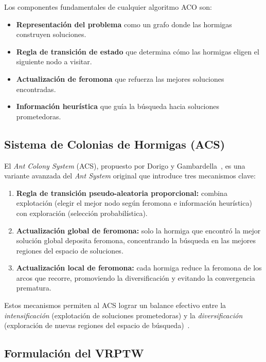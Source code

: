 \documentclass[12pt, letterpaper]{article}
\begin{document}
Los componentes fundamentales de cualquier algoritmo ACO son:
\begin{itemize}[leftmargin=2cm]
  \item \textbf{Representación del problema} como un grafo donde las hormigas construyen soluciones.
  \item \textbf{Regla de transición de estado} que determina cómo las hormigas eligen el siguiente nodo a visitar.
  \item \textbf{Actualización de feromona} que refuerza las mejores soluciones encontradas.
  \item \textbf{Información heurística} que guía la búsqueda hacia soluciones prometedoras.
\end{itemize}

\subsection{Sistema de Colonias de Hormigas (ACS)}
\label{subsec:acs}

El \textit{Ant Colony System} (ACS), propuesto por Dorigo y Gambardella~\cite{dorigo1997}, es una variante avanzada del \textit{Ant System} original que introduce tres mecanismos clave:

\begin{enumerate}[leftmargin=2cm]
  \item \textbf{Regla de transición pseudo-aleatoria proporcional:} combina explotación (elegir el mejor nodo según feromona e información heurística) con exploración (selección probabilística).
  \item \textbf{Actualización global de feromona:} solo la hormiga que encontró la mejor solución global deposita feromona, concentrando la búsqueda en las mejores regiones del espacio de soluciones.
  \item \textbf{Actualización local de feromona:} cada hormiga reduce la feromona de los arcos que recorre, promoviendo la diversificación y evitando la convergencia prematura.
\end{enumerate}

Estos mecanismos permiten al ACS lograr un balance efectivo entre la \textit{intensificación} (explotación de soluciones prometedoras) y la \textit{diversificación} (exploración de nuevas regiones del espacio de búsqueda)~\cite{dorigo1997}.

\subsection{Formulación del VRPTW}
\label{subsec:vrptw_formulacion}
\end{document}
